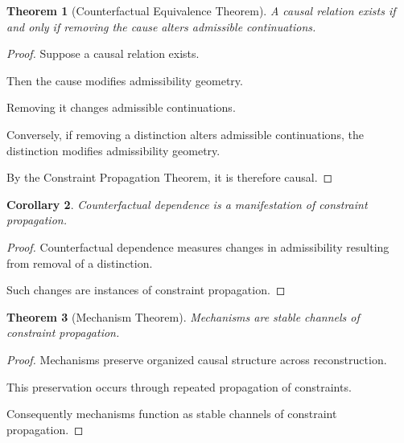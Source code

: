 \documentclass[12pt,oneside]{article}
\newtheorem{theorem}{Theorem}[section] \newtheorem{lemma}[theorem]{Lemma} \newtheorem{proposition}[theorem]{Proposition} \newtheorem{corollary}[theorem]{Corollary}
\theoremstyle{definition}
\begin{document}
\begin{theorem}[Counterfactual Equivalence Theorem]

A causal relation exists if and only if removing the cause alters admissible continuations.

\end{theorem}

\begin{proof}

Suppose a causal relation exists.

Then the cause modifies admissibility geometry.

Removing it changes admissible continuations.

Conversely, if removing a distinction alters admissible continuations, the distinction modifies admissibility geometry.

By the Constraint Propagation Theorem, it is therefore causal.

\end{proof}

\begin{corollary}

Counterfactual dependence is a manifestation of constraint propagation.

\end{corollary}

\begin{proof}

Counterfactual dependence measures changes in admissibility resulting from removal of a distinction.

Such changes are instances of constraint propagation.

\end{proof}

\begin{theorem}[Mechanism Theorem]

Mechanisms are stable channels of constraint propagation.

\end{theorem}

\begin{proof}

Mechanisms preserve organized causal structure across reconstruction.

This preservation occurs through repeated propagation of constraints.

Consequently mechanisms function as stable channels of constraint propagation.

\end{proof}
\end{document}

